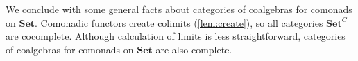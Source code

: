 \documentclass[11pt, oneside, article]{memoir}
\theoremstyle{plain}
\theoremstyle{definition}
\theoremstyle{remark}
\newenvironment{remark}
{\renewcommand\qedsymbol{$\lrcorner$}%
  \pushQED{\qed}\myremark}
{\popQED\endmyremark}
\newcommand{\bang}{\mathrm{!}}
\newcommand{\namedcat}[1]{\mathbf{#1}}
\newcommand{\cat}[1]{\mathbf{#1}}
\newcommand{\Set}{\namedcat{Set}}
\newcommand{\CoalgOn}[2]{{#2}^{#1}}
\newcommand{\CoalgSet}[1]{\CoalgOn{#1}{\Set}}
\newcommand{\CoalgS}[1]{\CoalgOn{#1}{\bS}}
\newcommand{\carr}{\Sigma}
\newcommand{\car}[1]{\carr^{#1}}
\newcommand{\carC}{\car{\cC}}
\newcommand{\cmnd}[1]{{#1}}
\newcommand{\eE}{E}
\newcommand{\cC}{\cmnd{C}}
\newcommand{\bS}{\cat{S}}
\newcommand{\CSet}{\CoalgSet{\cC}}
\newcommand{\CS}{\CoalgS{\cC}}
\newcommand{\trues}{\top}
\newcommand{\true}{\tau}
\begin{document}





We conclude with some general facts about categories of coalgebras for
comonads on $\Set$. Comonadic functors create
colimits (\cref{lem:create}), so all categories $\CSet$ are cocomplete.  Although
calculation of limits is less straightforward, categories of coalgebras
for comonads on $\Set$ are also complete.
\end{document}
